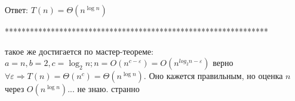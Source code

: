 \documentclass{article}
\begin{document}
Ответ: $T(n) = \Theta(n^{\log n})$

\medskip

***************************************************************

\medskip

такое же достигается по мастер-теореме: $a = n, b =2, c = \log_2 n; n = O(n^{c - \varepsilon}) = O(n^{log_2 n - \varepsilon})$
верно $\forall \varepsilon \Rightarrow T(n) = \Theta (n^{c}) = \Theta (n^{\log n})$. Оно кажется правильным, но оценка $n$ через $O(n^{\log n})$... не знаю. странно

\bigskip
\end{document}
